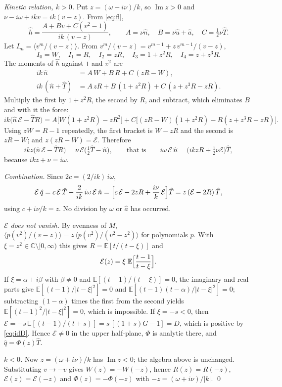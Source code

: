 \documentclass[11pt]{article}
\newcommand{\E}{\mathbb{E}}
\newcommand{\avg}[1]{\langle #1\rangle}
\renewcommand{\Im}{\operatorname{Im}}
\theoremstyle{remark}
\begin{document}
\emph{Kinetic relation, $k>0$.} Put $z = (\omega+i\nu)/k$, so $\Im z>0$ and
$\nu-i\omega+ikv = ik(v-z)$. From \eqref{eq:fl},
\[
  \hat h = \frac{A + Bv + C(v^2-1)}{ik\,(v-z)},\qquad
  A = \nu\hat n,\quad B = \nu\hat u + \hat a,\quad C = \tfrac12\nu\hat T .
\]
Let $I_m = \avg{v^m/(v-z)}$. From $v^m/(v-z) = v^{m-1} + z\,v^{m-1}/(v-z)$,
\[
  I_0 = W,\quad I_1 = R,\quad I_2 = zR,\quad I_3 = 1+z^2R,\quad
  I_4 = z+z^3R .
\]
The moments of $\hat h$ against $1$ and $v^2$ are
\begin{align*}
  ik\,\hat n &= A\,W + B\,R + C\,(zR-W),\\
  ik\,(\hat n+\hat T) &= A\,zR + B\,(1+z^2R) + C\,(z+z^3R-zR).
\end{align*}
Multiply the first by $1+z^2R$, the second by $R$, and subtract, which
eliminates $B$ and with it the force:
\[
  ik\bigl(\hat n\,\mathcal{E} - \hat T R\bigr)
  = A\bigl[W(1+z^2R)-zR^2\bigr]
  + C\bigl[(zR-W)(1+z^2R) - R(z+z^3R-zR)\bigr].
\]
Using $zW = R-1$ repeatedly, the first bracket is $W - zR$ and the second is
$zR - W$; and $z(zR-W) = \mathcal{E}$. Therefore
\[
  ikz\bigl(\hat n\,\mathcal{E} - \hat TR\bigr)
  = \nu\,\mathcal{E}\bigl(\tfrac12\hat T - \hat n\bigr),
  \qquad\text{that is}\qquad
  i\omega\,\mathcal{E}\,\hat n = \bigl(ikzR + \tfrac12\nu\mathcal{E}\bigr)\hat T,
\]
because $ikz+\nu = i\omega$.

\emph{Combination.} Since $2c = (2/ik)\,i\omega$,
\[
  \mathcal{E}\,\hat q = c\,\mathcal{E}\,\hat T - \frac{2}{ik}\,i\omega\,\mathcal{E}\,\hat n
  = \Bigl[c\,\mathcal{E} - 2zR + \frac{i\nu}{k}\,\mathcal{E}\Bigr]\hat T
  = z\,(\mathcal{E}-2R)\,\hat T ,
\]
using $c + i\nu/k = z$. No division by $\omega$ or $\hat a$ has occurred.

\emph{$\mathcal{E}$ does not vanish.} By evenness of $M$,
$\avg{p(v^2)/(v-z)} = z\,\avg{p(v^2)/(v^2-z^2)}$ for polynomials $p$. With
$\xi = z^2\in\mathbb{C}\setminus[0,\infty)$ this gives
$R = \E[t/(t-\xi)]$ and
\[
  \mathcal{E}(z) = \xi\;\E\Bigl[\frac{t-1}{t-\xi}\Bigr].
\]
If $\xi = \alpha+i\beta$ with $\beta\ne0$ and $\E[(t-1)/(t-\xi)] = 0$, the
imaginary and real parts give $\E[(t-1)/|t-\xi|^2] = 0$ and
$\E[(t-1)(t-\alpha)/|t-\xi|^2] = 0$; subtracting $(1-\alpha)$ times the first
from the second yields $\E[(t-1)^2/|t-\xi|^2] = 0$, which is impossible. If
$\xi = -s<0$, then
$\mathcal{E} = -s\,\E[(t-1)/(t+s)] = s\,[(1+s)G - 1] = D$, which is positive
by \eqref{eq:idD}. Hence
$\mathcal{E}\ne0$ in the upper half-plane, $\Phi$ is analytic there, and
$\hat q = \Phi(z)\hat T$.

\emph{$k<0$.} Now $z = (\omega+i\nu)/k$ has $\Im z<0$; the algebra above is
unchanged. Substituting $v\to-v$ gives $W(z) = -W(-z)$, hence
$R(z) = R(-z)$, $\mathcal{E}(z) = \mathcal{E}(-z)$ and
$\Phi(z) = -\Phi(-z)$ with $-z = (\omega+i\nu)/|k|$. \qed
\end{document}
